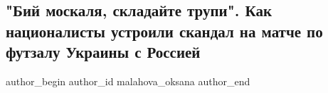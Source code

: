  
 
 
 
 
 
\subsection{"Бий москаля, складайте трупи". Как националисты устроили скандал на матче по футзалу Украины с Россией}
\label{sec:05_02_2022.stz.news.ua.strana.2.naciz_match_ukraina_rossia}
 
\ifcmt
 author_begin
   author_id malahova_oksana
 author_end
\fi
